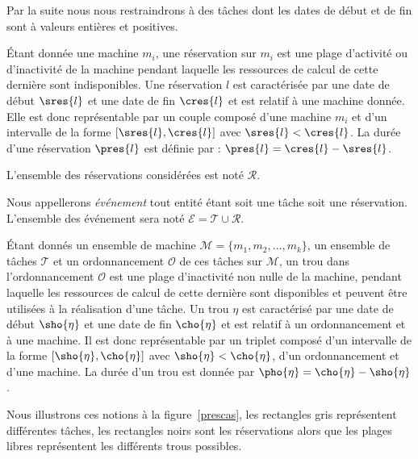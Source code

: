 \documentclass[a4paper,9pt]{book}
\begin{document}
\begin{nrmq}
    Par la suite nous nous restraindrons à des tâches dont les dates de début et de fin sont à
    valeurs entières et positives.
\end{nrmq}

\begin{ndf}[Réservation]
    Étant donnée une machine $m_i$, une réservation sur $m_i$ est une plage d'activité ou
    d'inactivité de la machine pendant laquelle les ressources de calcul de cette dernière sont
    indisponibles. Une réservation $l$ est caractérisée par une date de début $\sres{l}$ et une date de fin
    $\cres{l}$ et est relatif à une machine donnée. Elle est donc représentable par un couple composé
    d'une machine $m_i$ et d'un intervalle de la forme $[\sres{l}, \cres{l}]$ avec $\sres{l} < \cres{l}$.
    La durée d'une réservation $\pres{l}$ est définie par :  $\pres{l} = \cres{l} - \sres{l}$.

    L'ensemble des réservations considérées est noté $\mathcal{R}$.
\end{ndf}

\begin{nrmq}
    Nous appellerons \emph{événement} tout entité étant soit une tâche soit une réservation.
    L'ensemble des événement sera noté $\mathcal{E} = \mathcal{T} \cup \mathcal{R}$.
\end{nrmq}

\begin{ndf}[Trou]
    Étant donnés un ensemble de machine $\mathcal{M} = \{m_1, m_2, \dots, m_k\}$, un ensemble de
    tâches $\mathcal{T}$ et un ordonnancement $\mathcal{O}$ de ces tâches sur $\mathcal{M}$, un trou
    dans l'ordonnancement $\mathcal{O}$ est une plage d'inactivité non nulle de la machine, pendant
    laquelle les ressources de calcul de cette dernière sont disponibles et peuvent être utilisées à
    la réalisation d'une tâche. Un trou $\eta$ est caractérisé par une date de début $\sho{\eta}$ et
    une date de fin $\cho{\eta}$ et est relatif à un ordonnancement et à une machine. Il est donc
    représentable par un triplet composé d'un intervalle de la forme $[\sho{\eta}, \cho{\eta}]$ avec
    $\sho{\eta} < \cho{\eta}$, d'un ordonnancement et d'une machine. La durée d'un trou est donnée
    par $\pho{\eta} = \cho{\eta} - \sho{\eta}$.
\end{ndf}

\begin{nrmq}
    Nous illustrons ces notions à la figure~\ref{prescas}, les rectangles gris
    représentent différentes tâches, les rectangles noirs sont les réservations alors que les plages
    libres représentent les différents trous possibles.
\end{nrmq}
\end{document}
